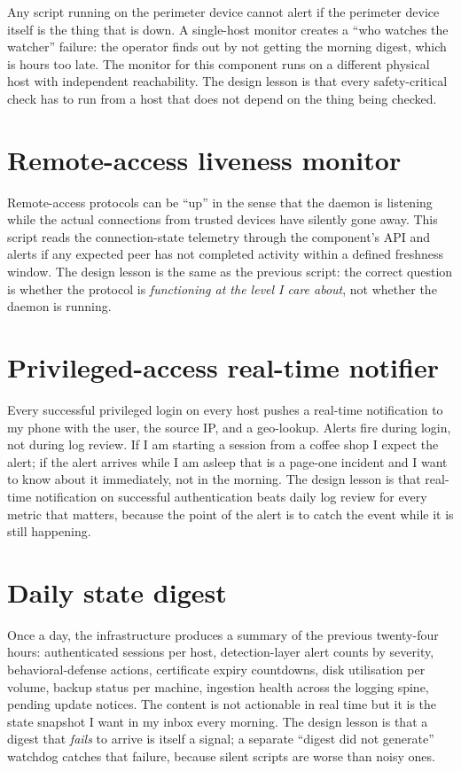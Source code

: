 \documentclass[12pt]{article}
\begin{document}
Any script running on the perimeter device cannot alert if the perimeter device itself is the thing that is down. A single-host monitor creates a ``who watches the watcher'' failure: the operator finds out by not getting the morning digest, which is hours too late. The monitor for this component runs on a different physical host with independent reachability. The design lesson is that every safety-critical check has to run from a host that does not depend on the thing being checked.

\section{Remote-access liveness monitor}

Remote-access protocols can be ``up'' in the sense that the daemon is listening while the actual connections from trusted devices have silently gone away. This script reads the connection-state telemetry through the component's API and alerts if any expected peer has not completed activity within a defined freshness window. The design lesson is the same as the previous script: the correct question is whether the protocol is \emph{functioning at the level I care about}, not whether the daemon is running.

\section{Privileged-access real-time notifier}

Every successful privileged login on every host pushes a real-time notification to my phone with the user, the source IP, and a geo-lookup. Alerts fire during login, not during log review. If I am starting a session from a coffee shop I expect the alert; if the alert arrives while I am asleep that is a page-one incident and I want to know about it immediately, not in the morning. The design lesson is that real-time notification on successful authentication beats daily log review for every metric that matters, because the point of the alert is to catch the event while it is still happening.

\section{Daily state digest}

Once a day, the infrastructure produces a summary of the previous twenty-four hours: authenticated sessions per host, detection-layer alert counts by severity, behavioral-defense actions, certificate expiry countdowns, disk utilisation per volume, backup status per machine, ingestion health across the logging spine, pending update notices. The content is not actionable in real time but it is the state snapshot I want in my inbox every morning. The design lesson is that a digest that \emph{fails} to arrive is itself a signal; a separate ``digest did not generate'' watchdog catches that failure, because silent scripts are worse than noisy ones.
\end{document}
